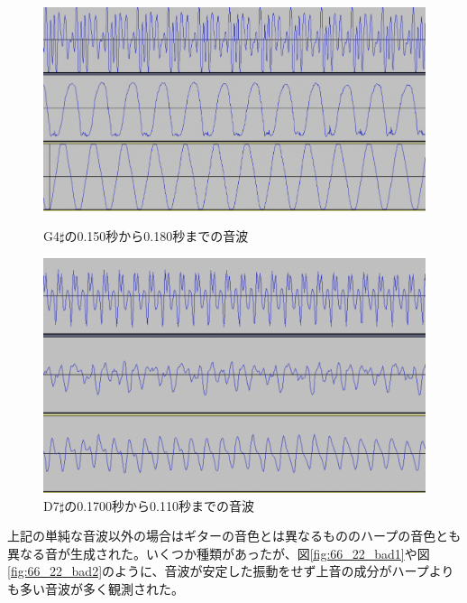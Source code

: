 \begin{figure}[t]
\begin{center}
\begin{minipage}{0.48\hsize}
\begin{center}
\includegraphics[width=0.9\hsize]{figure/66_22_det/g4s_0150_0180.png}
\caption{G4$\sharp$の0.150秒から0.180秒までの音波}
\label{fig:66_22_bad3}
\end{center}
\end{minipage}
\begin{minipage}{0.48\hsize}
\begin{center}
\includegraphics[width=0.9\hsize]{figure/66_22_det/d7s_0100_0110.png}
\caption{D7$\sharp$の0.1700秒から0.110秒までの音波}
\label{fig:66_22_bad4}
\end{center}
\end{minipage}
\end{center}
\end{figure}

上記の単純な音波以外の場合はギターの音色とは異なるもののハープの音色とも異なる音が生成された。いくつか種類があったが、図\ref{fig:66_22_bad1}や図\ref{fig:66_22_bad2}のように、音波が安定した振動をせず上音の成分がハープよりも多い音波が多く観測された。

